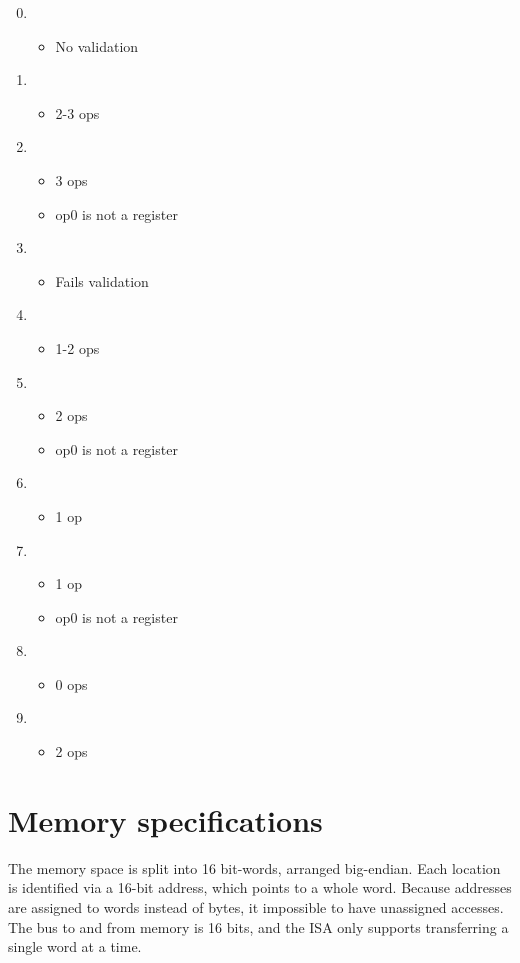 \documentclass[12pt]{article}
\begin{document}
\begin{enumerate}
\setcounter{enumi}{-1}
\item \begin{itemize} \item No validation \end{itemize}
\item \begin{itemize} \item 2-3 ops \end{itemize}
\item \begin{itemize}
    \item 3 ops
    \item op0 is not a register
    \end{itemize}
\item \begin {itemize} \item Fails validation \end{itemize}
\item \begin {itemize} \item 1-2 ops \end{itemize}
\item \begin {itemize}
     \item 2 ops
     \item op0 is not a register
     \end{itemize}
\item \begin{itemize} \item 1 op \end{itemize}
\item \begin{itemize}
        \item 1 op
        \item op0 is not a register
      \end{itemize}
\item \begin {itemize} \item 0 ops \end{itemize}
\item \begin {itemize} \item 2 ops \end{itemize}
\end{enumerate}

\section{Memory specifications}
The memory space is split into 16 bit-words, arranged big-endian.
Each location is identified via a 16-bit address, which points to a whole word.
Because addresses are assigned to words instead of bytes, it impossible to have unassigned accesses.
The bus to and from memory is 16 bits, and the ISA only supports transferring a single word at a time.
\end{document}
